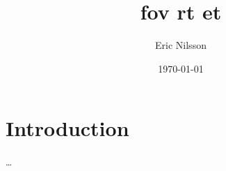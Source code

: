 \documentclass[12pt,twocolumn]{article}
\begin{document}
\title{fov rt et}
\author{Eric Nilsson}
\date{\today}
\maketitle
\abstract{\ldots}

\section{Introduction}
\ldots
\end{document}
